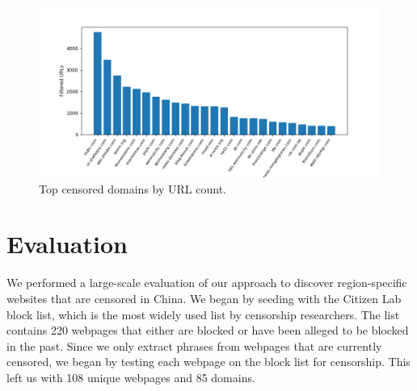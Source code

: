 \begin{table}[b]
  \begin{center}
  \end{center}
\caption{\label{breakdown} Total number of censored domains discovered.}
\end{table}

\begin{figure}[t]
  \centering
  \includegraphics[scale=0.6]{figures/top-domains}
  \caption{\label{top-domains}Top censored domains by URL count.}
\end{figure}

\section{Evaluation}

We performed a large-scale evaluation of our approach to
discover region-specific websites that are censored in China.  We
began by seeding with the Citizen Lab block list, which is
the most widely used list by censorship researchers. The list contains
220 webpages that either are blocked or have been alleged to be blocked in
the past. Since we only extract phrases from webpages that are
currently censored, we began by testing each webpage on the block list for
censorship. This left us with 108 unique webpages and 85 domains.

